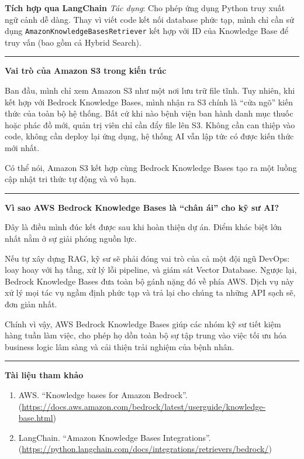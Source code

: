 \textbf{Tích hợp qua LangChain} \emph{Tác dụng}: Cho phép ứng dụng
Python truy xuất ngữ cảnh dễ dàng. Thay vì viết code kết nối database
phức tạp, mình chỉ cần sử dụng \texttt{AmazonKnowledgeBasesRetriever}
kết hợp với ID của Knowledge Base để truy vấn (bao gồm cả Hybrid
Search).

\begin{center}\rule{0.5\linewidth}{0.5pt}\end{center}

\vspace{0.5em}\noindent\textbf{Vai trò của Amazon S3 trong kiến trúc}

Ban đầu, mình chỉ xem Amazon S3 như một nơi lưu trữ file tĩnh. Tuy
nhiên, khi kết hợp với Bedrock Knowledge Bases, mình nhận ra S3 chính là
``cửa ngõ'' kiến thức của toàn bộ hệ thống. Bất cứ khi nào bệnh viện ban
hành danh mục thuốc hoặc phác đồ mới, quản trị viên chỉ cần đẩy file lên
S3. Không cần can thiệp vào code, không cần deploy lại ứng dụng, hệ
thống AI vẫn lập tức có được kiến thức mới nhất.

Có thể nói, Amazon S3 kết hợp cùng Bedrock Knowledge Bases tạo ra một
luồng cập nhật tri thức tự động và vô hạn.

\begin{center}\rule{0.5\linewidth}{0.5pt}\end{center}

\vspace{0.5em}\noindent\textbf{Vì sao AWS Bedrock Knowledge Bases là ``chân ái'' cho kỹ
sư AI?}

Đây là điều mình đúc kết được sau khi hoàn thiện dự án. Điểm khác biệt
lớn nhất nằm ở sự giải phóng nguồn lực.

Nếu tự xây dựng RAG, kỹ sư sẽ phải đóng vai trò của cả một đội ngũ
DevOps: loay hoay với hạ tầng, xử lý lỗi pipeline, và giám sát Vector
Database. Ngược lại, Bedrock Knowledge Bases đưa toàn bộ gánh nặng đó về
phía AWS. Dịch vụ này xử lý mọi tác vụ ngầm định phức tạp và trả lại cho
chúng ta những API sạch sẽ, đơn giản nhất.

Chính vì vậy, AWS Bedrock Knowledge Bases giúp các nhóm kỹ sư tiết kiệm
hàng tuần làm việc, cho phép họ dồn toàn bộ sự tập trung vào việc tối ưu
hóa business logic lâm sàng và cải thiện trải nghiệm của bệnh nhân.

\begin{center}\rule{0.5\linewidth}{0.5pt}\end{center}

\vspace{0.5em}\noindent\textbf{Tài liệu tham khảo}

\begin{enumerate}
\def\labelenumi{\arabic{enumi}.}
\tightlist
\item
  AWS. ``Knowledge bases for Amazon Bedrock''.
  (\url{https://docs.aws.amazon.com/bedrock/latest/userguide/knowledge-base.html})
\item
  LangChain. ``Amazon Knowledge Bases Integrations''.
  (\url{https://python.langchain.com/docs/integrations/retrievers/bedrock/})
\end{enumerate}
